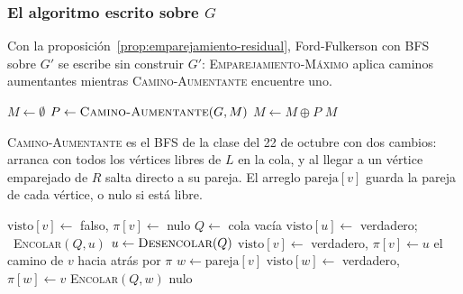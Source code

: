 \documentclass[11pt,letterpaper]{article}
\begin{document}
\subsubsection*{El algoritmo escrito sobre $G$}

Con la proposición~\ref{prop:emparejamiento-residual}, Ford-Fulkerson
con BFS sobre $G'$ se escribe sin construir $G'$:
\textsc{Emparejamiento-Máximo} aplica caminos aumentantes mientras
\textsc{Camino-Aumentante} encuentre uno.

\begin{algorithm}[H]
\caption{\textsc{Emparejamiento-Máximo}$(G, L, R)$}
\label{alg:emparejamiento-maximo}
\begin{algorithmic}[1]
  \State $M \gets \emptyset$
  \Repeat
    \State $P \gets \textsc{Camino-Aumentante}(G, M)$
      \State $M \gets M \oplus P$ 
    \EndIf
  \State \Return $M$
\EndProcedure
\end{algorithmic}
\end{algorithm}

\textsc{Camino-Aumentante} es el BFS de la clase del 22 de octubre
con dos cambios: arranca con todos los vértices libres de $L$ en la
cola, y al llegar a un vértice emparejado de $R$ salta directo a su
pareja. El arreglo $\text{pareja}[v]$ guarda la pareja de cada
vértice, o nulo si está libre.

\begin{algorithm}[H]
\caption{\textsc{Camino-Aumentante}$(G, M)$}
\label{alg:emparejamiento-camino}
\begin{algorithmic}[1]
    \State $\text{visto}[v] \gets$ falso, \quad $\pi[v] \gets$ nulo
  \EndFor
  \State $Q \gets$ cola vacía
    \State $\text{visto}[u] \gets$ verdadero; \ \textsc{Encolar}$(Q, u)$
  \EndFor
    \State $u \gets \textsc{Desencolar}(Q)$ 
        \State $\text{visto}[v] \gets$ verdadero, \quad $\pi[v] \gets u$
          \State \Return el camino de $v$ hacia atrás por $\pi$
        \EndIf
        \State $w \gets \text{pareja}[v]$
        \State $\text{visto}[w] \gets$ verdadero, \quad
               $\pi[w] \gets v$
        \State \textsc{Encolar}$(Q, w)$
      \EndIf
    \EndFor
  \EndWhile
  \State \Return nulo
\EndProcedure
\end{algorithmic}
\end{algorithm}
\end{document}

